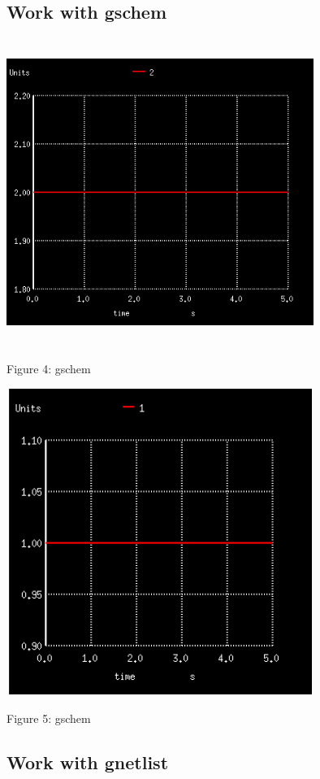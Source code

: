 \documentclass{report}
\begin{document}
\subsection{Work with gschem}
 \begin{center}
\includegraphics[width=10cm,height=10cm,keepaspectratio]{oneFig.png}

Figure 4: gschem
\end{center}
\begin{center}
\includegraphics[width=10cm,height=10cm,keepaspectratio]{twoFig.png}

Figure 5: gschem
\end{center}


\subsection{ Work with gnetlist}
 
\end{document}

